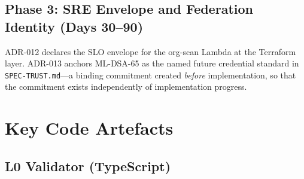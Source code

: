 \documentclass[12pt,a4paper]{article}
\theoremstyle{definition}
\theoremstyle{remark}
\begin{document}
\subsection{Phase 3: SRE Envelope and Federation Identity (Days 30--90)}

ADR-012 declares the SLO envelope for the org-scan Lambda at the Terraform
layer. ADR-013 anchors ML-DSA-65 as the named future credential standard
in \texttt{SPEC-TRUST.md}---a binding commitment created \emph{before}
implementation, so that the commitment exists independently of implementation
progress.


\section{Key Code Artefacts}

\subsection{L0 Validator (TypeScript)}
\end{document}
